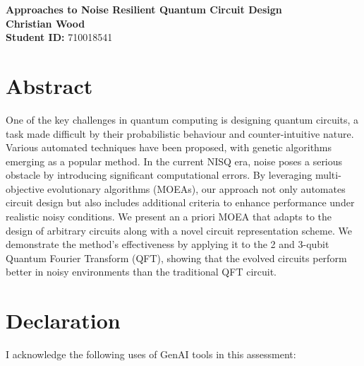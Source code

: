 \documentclass[11pt,a4paper]{article}
\begin{document}
\singlespacing %
\thispagestyle{empty} %

\begin{center}
{\bf \LARGE Approaches to Noise Resilient Quantum Circuit Design}\\[0.5cm]
  \textbf{Christian Wood} \\[0.2cm]
  \textbf{Student ID:} 710018541 \\[1cm]
\end{center}

\section*{Abstract}
\noindent 
One of the key challenges in quantum computing is designing quantum circuits, a task made difficult by their probabilistic behaviour and counter-intuitive nature. Various automated techniques have been proposed, with genetic algorithms emerging as a popular method. In the current NISQ era, noise poses a serious obstacle by introducing significant computational errors. By leveraging multi-objective evolutionary algorithms (MOEAs), our approach not only automates circuit design but also includes additional criteria to enhance performance under realistic noisy conditions. We present an a priori MOEA that adapts to the design of arbitrary circuits along with a novel circuit representation scheme. We demonstrate the method’s effectiveness by applying it to the 2 and 3-qubit Quantum Fourier Transform (QFT), showing that the evolved circuits perform better in noisy environments than the traditional QFT circuit.

\newpage
\thispagestyle{empty} 
\section*{Declaration}
I acknowledge the following uses of GenAI tools in this assessment: 
\end{document}
